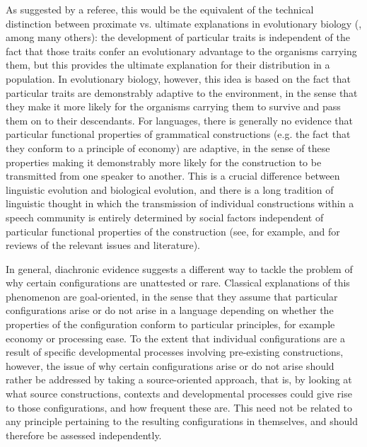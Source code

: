 \documentclass[output=paper]{langsci/langscibook}
\begin{document}
As suggested
by a referee, this would
be the equivalent of the technical distinction between proximate vs. ultimate  explanations in
evolutionary biology  (\citealt{proximateultimate}, among many others):
the development of particular traits is independent of the fact that
those traits confer an evolutionary advantage to the organisms
carrying them, but this provides the ultimate explanation for their
distribution in a population.  In evolutionary biology,  however, this idea
is based on the fact that particular traits are demonstrably adaptive
to the environment, in the sense that they make it more likely for the organisms
carrying them to survive and pass them on to their
descendants. For languages, there is generally no
evidence
that particular functional properties of grammatical
constructions (e.g. the fact that they conform to a principle of
economy) are adaptive, in the sense of these properties making it
demonstrably more
likely for the construction to be transmitted from one speaker to
another. This is a crucial difference between linguistic
evolution and biological evolution, and there is a long tradition of
linguistic thought in which the transmission of individual
constructions within  a speech community is entirely determined by
social factors independent of particular functional properties of the
construction (see, for example, \citealt{McMahon1994}
and \citealt{BillLC} for reviews of the relevant issues and literature).

\largerpage
In general, diachronic evidence 
suggests a different way to tackle the
problem of why certain configurations are unattested or rare. Classical explanations of this phenomenon are goal-oriented, in the sense that they
assume that particular configurations arise or do not arise in a
language depending on whether the
properties of the configuration conform to particular principles, for
example economy or
processing ease. To the extent that individual configurations are a
result of specific developmental processes involving pre-existing
constructions, however, the issue of why certain configurations arise
or do not arise should rather be addressed by taking a source-oriented
approach,  that is, by looking at what
source constructions, contexts and developmental processes  could
give rise to those configurations, and how frequent these are. This
need not be related to any principle pertaining to the resulting configurations in
themselves, and should therefore be assessed independently.
\end{document}
